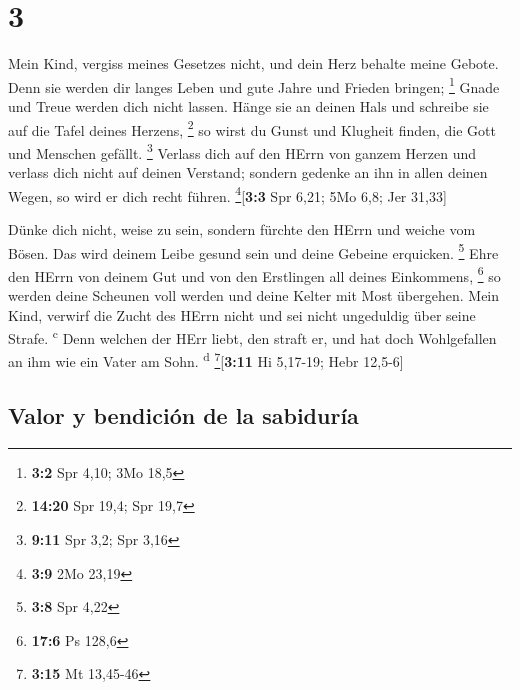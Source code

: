 \hypertarget{section-2}{%
\section{3}\label{section-2}}

 Mein Kind, vergiss meines Gesetzes nicht, und dein Herz
behalte meine Gebote.  Denn sie werden dir langes Leben
und gute Jahre und Frieden bringen; \footnote{\textbf{3:2} Spr 4,10; 3Mo
  18,5}  Gnade und Treue werden dich nicht lassen. Hänge
sie an deinen Hals und schreibe sie auf die Tafel deines Herzens,
\footnote{\textbf{14:20} Spr 19,4; Spr 19,7}  so wirst du
Gunst und Klugheit finden, die Gott und Menschen gefällt. \footnote{\textbf{9:11}
  Spr 3,2; Spr 3,16}  Verlass dich auf den HErrn von
ganzem Herzen und verlass dich nicht auf deinen Verstand; 
sondern gedenke an ihn in allen deinen Wegen, so wird er dich recht
führen. \footnote{\textbf{3:9} 2Mo 23,19}{[}\textbf{3:3} Spr 6,21; 5Mo
6,8; Jer 31,33{]}

 Dünke dich nicht, weise zu sein, sondern fürchte den
HErrn und weiche vom Bösen.  Das wird deinem Leibe gesund
sein und deine Gebeine erquicken. \footnote{\textbf{3:8} Spr 4,22}
 Ehre den HErrn von deinem Gut und von den Erstlingen all
deines Einkommens, \footnote{\textbf{17:6} Ps 128,6}  so
werden deine Scheunen voll werden und deine Kelter mit Most übergehen.
 Mein Kind, verwirf die Zucht des HErrn nicht und sei
nicht ungeduldig über seine Strafe. \textsuperscript{c} 
Denn welchen der HErr liebt, den straft er, und hat doch Wohlgefallen an
ihm wie ein Vater am Sohn. \textsuperscript{d}
\footnote{\textbf{3:15} Mt 13,45-46}{[}\textbf{3:11} Hi 5,17-19; Hebr
12,5-6{]}

\hypertarget{valor-y-bendiciuxf3n-de-la-sabiduruxeda}{%
\subsection{Valor y bendición de la
sabiduría}\label{valor-y-bendiciuxf3n-de-la-sabiduruxeda}}


